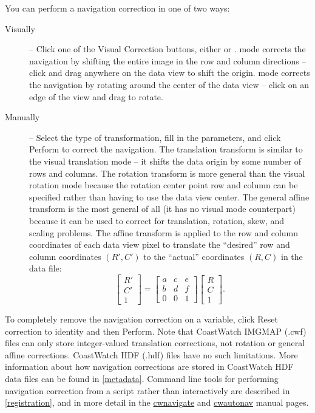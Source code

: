 You can perform a navigation correction in one of two ways:
\begin{description}

\item[Visually] -- Click one of the {\gui Visual Correction} buttons,
either  or
.
 mode corrects the navigation by
shifting the entire image in the row and column directions --
click and drag anywhere on the data view to shift the origin.
 mode corrects the navigation
by rotating around the center of the data view -- click on an
edge of the view and drag to rotate.

\item[Manually] -- Select the type of transformation, fill in the
parameters, and click {\gui Perform} to correct the navigation.
The {\gui translation transform} is similar to the visual
translation mode -- it shifts the data origin by some number of
rows and columns.  The {\gui rotation transform} is more general
than the visual rotation mode because the rotation center point
row and column can be specified rather than having to use the
data view center.  The {\gui general affine transform} is the most
general of all (it has no visual mode counterpart) because it can
be used to correct for translation, rotation, skew, and scaling
problems.  The affine transform is applied to the row and column
coordinates of each data view pixel to translate the ``desired''
row and column coordinates $(R',C')$ to the ``actual''
coordinates $(R,C)$ in the data file:
\[
  \left[ \begin{array}{c}
           R' \\
           C' \\
           1
         \end{array}  
  \right]
  = 
  \left[ \begin{array}{ccc}
           a & c & e \\
           b & d & f \\
           0 & 0 & 1
         \end{array}
  \right]
  \left[ \begin{array}{c}
           R \\
           C \\
           1
         \end{array}
  \right] .
\]
\end{description}
To completely remove the navigation correction on a variable,
click {\gui Reset correction to identity} and then {\gui Perform}.
Note that CoastWatch IMGMAP (.cwf) files can only store
integer-valued translation corrections, not rotation or general
affine corrections.  CoastWatch HDF (.hdf) files have no such
limitations.  More information about how navigation corrections
are stored in CoastWatch HDF data files can be found in
\autoref{metadata}.  Command line tools for performing navigation
correction from a script rather than interactively are described
in \autoref{registration}, and in more detail in the
\hyperlink{cwnavigate}{cwnavigate} and
\hyperlink{cwautonav}{cwautonav} manual pages.

